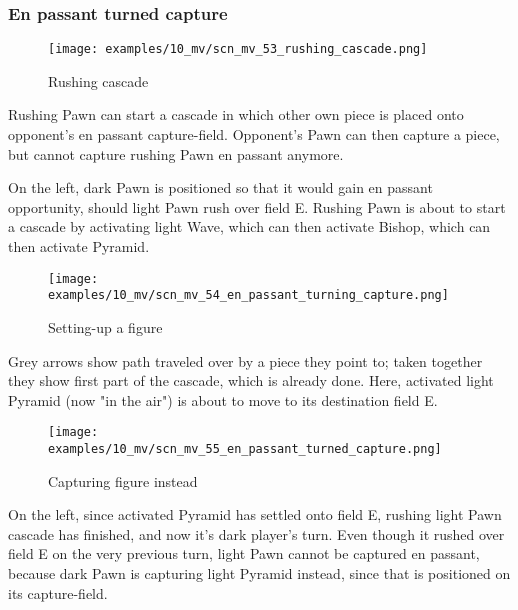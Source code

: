 \subsubsection*{En passant turned capture}
\label{sec:Miranda's veil/Wave/Cascading Waves/En passant turned capture}

\vspace*{-0.7\baselineskip}
\noindent
\begin{wrapfigure}[15]{l}{0.4\textwidth}
\centering
\texttt{[image: examples/10\_mv/scn\_mv\_53\_rushing\_cascade.png]}
\vspace*{-1.4\baselineskip}
\caption{Rushing cascade}
\label{fig:scn_mv_53_rushing_cascade}
\end{wrapfigure}
Rushing Pawn can start a cascade in which other own piece is placed onto opponent's
en passant capture-field.
Opponent's Pawn can then capture a piece, but cannot capture rushing Pawn en passant
anymore.

On the left, dark Pawn is positioned so that it would gain en passant opportunity,
should light Pawn rush over field E. Rushing Pawn is about to start a cascade by
activating light Wave, which can then activate Bishop, which can then activate
Pyramid.

\noindent
\begin{wrapfigure}[7]{l}{0.4\textwidth}
\centering
\texttt{[image: examples/10\_mv/scn\_mv\_54\_en\_passant\_turning\_capture.png]}
\vspace*{-1.4\baselineskip}
\caption{Setting-up a figure}
\label{fig:scn_mv_54_en_passant_turning_capture}
\end{wrapfigure}
Grey arrows show path traveled over by a piece they point to; taken together they
show first part of the cascade, which is already done. \newline
\indent
Here, activated light Pyramid (now "in the air") is about to move to its destination
field E.

\clearpage %

\vspace*{-2.1\baselineskip}
\noindent
\begin{wrapfigure}[11]{l}{0.4\textwidth}
\centering
\texttt{[image: examples/10\_mv/scn\_mv\_55\_en\_passant\_turned\_capture.png]}
\vspace*{-1.4\baselineskip}
\caption{Capturing figure instead}
\label{fig:scn_mv_55_en_passant_turned_capture}
\end{wrapfigure}
On the left, since activated Pyramid has settled onto field E, rushing light Pawn
cascade has finished, and now it's dark player's turn. \newline
\indent
Even though it rushed over field E on the very previous turn, light Pawn cannot
be captured en passant, because dark Pawn is capturing light Pyramid instead,
since that is positioned on its capture-field.

